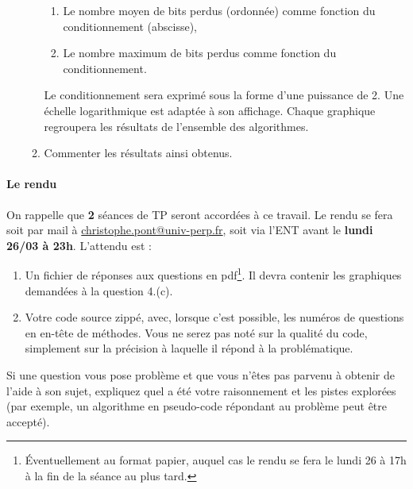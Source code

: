 \documentclass{exam}
\begin{document}
\begin{enumerate}
\begin{enumerate}
            \begin{enumerate}
                \item Le nombre moyen de bits perdus (ordonnée) comme fonction du conditionnement (abscisse),
                \item Le nombre maximum de bits perdus comme fonction du conditionnement.
            \end{enumerate}
            Le conditionnement sera exprimé sous la forme d’une puissance de 2. Une échelle logarithmique est adaptée à son affichage. Chaque graphique regroupera les résultats de l’ensemble des algorithmes.
            \item Commenter les résultats ainsi obtenus.
        \end{enumerate}
    \end{enumerate}

    \paragraph{Le rendu}
    On rappelle que \textbf{2} séances de TP seront accordées à ce travail.
    Le rendu se fera soit par mail à \href{mailto:christophe.pont@univ-perp.fr}{christophe.pont@univ-perp.fr}, soit via l'ENT avant le \textbf{lundi 26/03 à 23h}.
    L'attendu est :
    \begin{enumerate}
        \item Un fichier de réponses aux questions en pdf\footnote{Éventuellement au format papier, auquel cas le rendu se fera le lundi 26 à 17h à la fin de la séance au plus tard.}. Il devra contenir les graphiques demandées à la question 4.(c).
        \item Votre code source zippé, avec, lorsque c'est possible, les numéros de questions en en-tête de méthodes. Vous ne serez pas noté sur la qualité du code, simplement sur la précision à laquelle il répond à la problématique.
    \end{enumerate}
    Si une question vous pose problème et que vous n'êtes pas parvenu à obtenir de l'aide à son sujet, expliquez quel a été votre raisonnement et les pistes explorées (par exemple, un algorithme en pseudo-code répondant au problème peut être accepté).
\end{document}
